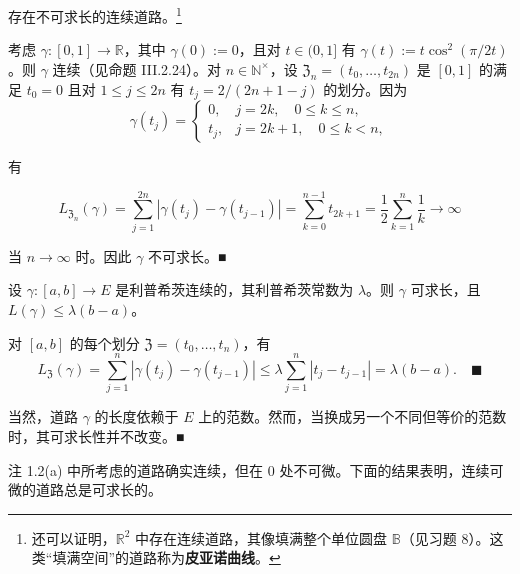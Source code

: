 \begin{remark}

\begin{items}
\item

存在不可求长的连续道路。\footnote{还可以证明，$ \mathbb{R}^{2} $ 中存在连续道路，其像填满整个单位圆盘 $ \mathbb{B} $（见习题 8）。这类“填满空间”的道路称为\textbf{皮亚诺曲线}。}

\proofhead
考虑 $ \gamma : [0,1] \to \mathbb{R} $，其中 $ \gamma(0) := 0 $，且对 $ t \in (0,1] $ 有 $ \gamma(t) := t\cos^{2}(\pi/2t) $。则 $ \gamma $ 连续（见命题 III.2.24）。对 $ n \in \mathbb{N}^\times $，设 $ \mathfrak{Z}_n = (t_0,\ldots,t_{2n}) $ 是 $ [0,1] $ 的满足 $ t_0 = 0 $ 且对 $ 1 \le j \le 2n $ 有 $ t_j = 2/(2n + 1 - j) $ 的划分。因为
\begin{equation*}
\gamma(t_j) = \begin{cases} 0, & j = 2k,\quad 0 \le k \le n, \\ t_j, & j = 2k + 1,\quad 0 \le k < n, \end{cases}
\end{equation*}

有

\[
L_{\mathfrak{Z}_n}(\gamma) = \sum_{j=1}^{2n}|\gamma(t_j) - \gamma(t_{j-1})| = \sum_{k=0}^{n-1} t_{2k+1} = \frac{1}{2}\sum_{k=1}^{n}\frac{1}{k} \to \infty
\]

当 $ n \to \infty $ 时。因此 $ \gamma $ 不可求长。\nobreak\hspace{0.35em}■

\item

设 $ \gamma : [a,b] \to E $ 是利普希茨连续的，其利普希茨常数为 $ \lambda $。则 $ \gamma $ 可求长，且 $ L(\gamma) \le \lambda(b - a) $。

\proofhead
对 $ [a,b] $ 的每个划分 $ \mathfrak{Z} = (t_0,\ldots,t_n) $，有
\[
L_{\mathfrak{Z}}(\gamma) = \sum_{j=1}^{n}|\gamma(t_j) - \gamma(t_{j-1})| \le \lambda\sum_{j=1}^{n}|t_j - t_{j-1}| = \lambda(b - a) .\quad\blacksquare
\]
\item

当然，道路 $ \gamma $ 的长度依赖于 $ E $ 上的范数。然而，当换成另一个不同但等价的范数时，其可求长性并不改变。\nobreak\hspace{0.35em}■

\end{items}

注 1.2(a) 中所考虑的道路确实连续，但在 0 处不可微。下面的结果表明，连续可微的道路总是可求长的。

\end{remark}


